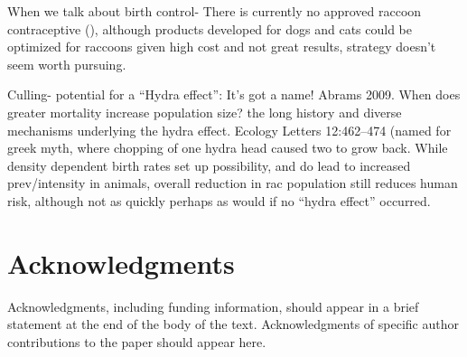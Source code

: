 \documentclass[11pt]{article}
\begin{document}
When we talk about birth control- There is currently no approved raccoon
contraceptive (), although products developed for dogs and cats could be
optimized for raccoons given high cost and not great results, strategy
doesn't seem worth pursuing.

Culling- potential for a ``Hydra effect'': It's got a name! Abrams 2009.
When does greater mortality increase population size? the long history
and diverse mechanisms underlying the hydra effect. Ecology Letters
12:462--474 (named for greek myth, where chopping of one hydra head
caused two to grow back. While density dependent birth rates set up
possibility, and do lead to increased prev/intensity in animals, overall
reduction in rac population still reduces human risk, although not as
quickly perhaps as would if no ``hydra effect'' occurred.

\section{Acknowledgments} 

Acknowledgments, including funding
information, should appear in a brief statement at the end of the body
of the text. Acknowledgments of specific author contributions to the
paper should appear here.





\clearpage
\end{document}
